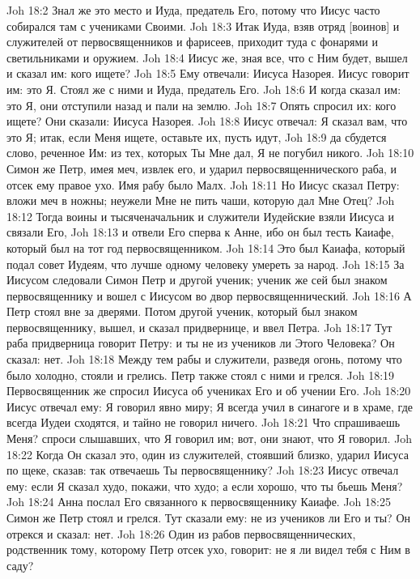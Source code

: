 Joh 18:2  Знал же это место и Иуда, предатель Его, потому что Иисус часто собирался там с учениками Своими.
Joh 18:3  Итак Иуда, взяв отряд [воинов] и служителей от первосвященников и фарисеев, приходит туда с фонарями и светильниками и оружием.
Joh 18:4  Иисус же, зная все, что с Ним будет, вышел и сказал им: кого ищете?
Joh 18:5  Ему отвечали: Иисуса Назорея. Иисус говорит им: это Я. Стоял же с ними и Иуда, предатель Его.
Joh 18:6  И когда сказал им: это Я, они отступили назад и пали на землю.
Joh 18:7  Опять спросил их: кого ищете? Они сказали: Иисуса Назорея.
Joh 18:8  Иисус отвечал: Я сказал вам, что это Я; итак, если Меня ищете, оставьте их, пусть идут,
Joh 18:9  да сбудется слово, реченное Им: из тех, которых Ты Мне дал, Я не погубил никого.
Joh 18:10  Симон же Петр, имея меч, извлек его, и ударил первосвященнического раба, и отсек ему правое ухо. Имя рабу было Малх.
Joh 18:11  Но Иисус сказал Петру: вложи меч в ножны; неужели Мне не пить чаши, которую дал Мне Отец?
Joh 18:12  Тогда воины и тысяченачальник и служители Иудейские взяли Иисуса и связали Его,
Joh 18:13  и отвели Его сперва к Анне, ибо он был тесть Каиафе, который был на тот год первосвященником.
Joh 18:14  Это был Каиафа, который подал совет Иудеям, что лучше одному человеку умереть за народ.
Joh 18:15  За Иисусом следовали Симон Петр и другой ученик; ученик же сей был знаком первосвященнику и вошел с Иисусом во двор первосвященнический.
Joh 18:16  А Петр стоял вне за дверями. Потом другой ученик, который был знаком первосвященнику, вышел, и сказал придвернице, и ввел Петра.
Joh 18:17  Тут раба придверница говорит Петру: и ты не из учеников ли Этого Человека? Он сказал: нет.
Joh 18:18  Между тем рабы и служители, разведя огонь, потому что было холодно, стояли и грелись. Петр также стоял с ними и грелся.
Joh 18:19  Первосвященник же спросил Иисуса об учениках Его и об учении Его.
Joh 18:20  Иисус отвечал ему: Я говорил явно миру; Я всегда учил в синагоге и в храме, где всегда Иудеи сходятся, и тайно не говорил ничего.
Joh 18:21  Что спрашиваешь Меня? спроси слышавших, что Я говорил им; вот, они знают, что Я говорил.
Joh 18:22  Когда Он сказал это, один из служителей, стоявший близко, ударил Иисуса по щеке, сказав: так отвечаешь Ты первосвященнику?
Joh 18:23  Иисус отвечал ему: если Я сказал худо, покажи, что худо; а если хорошо, что ты бьешь Меня?
Joh 18:24  Анна послал Его связанного к первосвященнику Каиафе.
Joh 18:25  Симон же Петр стоял и грелся. Тут сказали ему: не из учеников ли Его и ты? Он отрекся и сказал: нет.
Joh 18:26  Один из рабов первосвященнических, родственник тому, которому Петр отсек ухо, говорит: не я ли видел тебя с Ним в саду?
